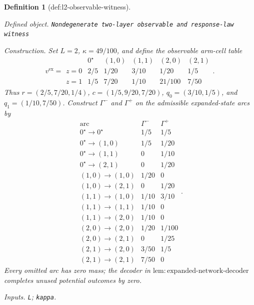 \documentclass{article}
\newtheorem{definition}{Definition}
\begin{document}
\begin{definition}[def:l2-observable-witness]\label{def:l2-observable-witness}
\par\smallskip\noindent\emph{Defined object.} \texttt{Nondegenerate two-\allowbreak{}layer observable and response-\allowbreak{}law witness}
\par\smallskip\noindent\emph{Construction.} Set \(L=2\), \(\kappa=49/100\), and define the observable arm-cell table \[v^{\mathrm{ex}}=\begin{array}{c|ccccc}&0^{\star}&(1,0)&(1,1)&(2,0)&(2,1)\\\hline z=0&2/5&1/20&3/10&1/20&1/5\\z=1&1/5&7/20&1/10&21/100&7/50\end{array}.\] Thus \(r=(2/5,7/20,1/4)\), \(c=(1/5,9/20,7/20)\), \(q_0=(3/10,1/5)\), and \(q_1=(1/10,7/50)\). Construct \(\Gamma^-\) and \(\Gamma^+\) on the admissible expanded-state arcs by \[\begin{array}{c|cc}\text{arc}&\Gamma^-&\Gamma^+\\\hline 0^{\star}\to0^{\star}&1/5&1/5\\0^{\star}\to(1,0)&1/5&1/20\\0^{\star}\to(1,1)&0&1/10\\0^{\star}\to(2,1)&0&1/20\\(1,0)\to(1,0)&1/20&0\\(1,0)\to(2,1)&0&1/20\\(1,1)\to(1,0)&1/10&3/10\\(1,1)\to(1,1)&1/10&0\\(1,1)\to(2,0)&1/10&0\\(2,0)\to(2,0)&1/20&1/100\\(2,0)\to(2,1)&0&1/25\\(2,1)\to(2,0)&3/50&1/5\\(2,1)\to(2,1)&7/50&0\end{array}.\] Every omitted arc has zero mass; the decoder in \(\mathrm{lem{:}expanded\mbox{-}network\mbox{-}decoder}\) completes unused potential outcomes by zero.
\par\smallskip\noindent\emph{Inputs.} \texttt{L}; \texttt{kappa}.
\end{definition}
\end{document}
